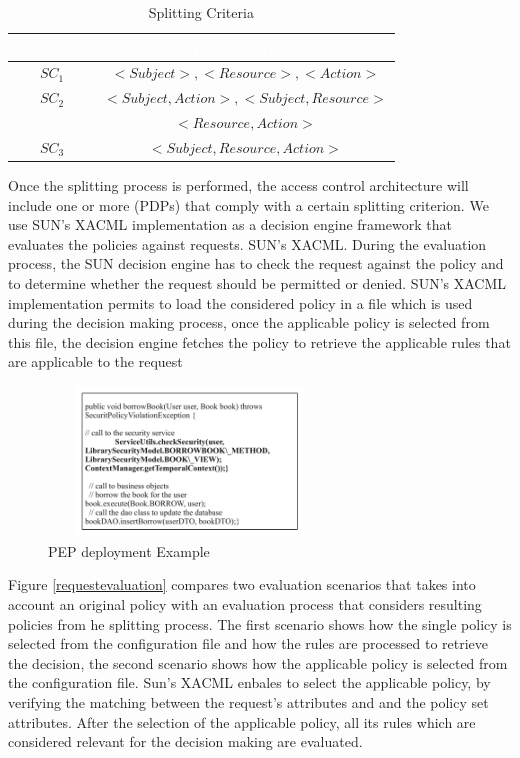 \begin{table}[h!]
\centering
\setlength{\extrarowheight}{6 pt}
\begin{tabular}{|>{\small}c|>{\small}c|} 
\hline  \rowcolor{black} 
\bf
\textcolor{white}{Categories}& \bf \textcolor{white}{Splitting Criteria}\\ \hline
$SC_{1}$& {$<Subject>, <Resource>, <Action>$}\\ \hline
$SC_{2}$& {$<Subject,Action>, <Subject,Resource>$}\\&{$<Resource,Action>$}\\  \hline
$SC_{3}$& {$<Subject,Resource,Action>$}\\ \hline
\end{tabular}
\caption{Splitting Criteria}
\label{table1}\end{table}


Once the splitting process is performed, the access control architecture will include one or more (PDPs) that comply with a certain splitting criterion.
We use SUN's XACML implementation \cite{sunxacml} as a decision engine framework that evaluates the policies against requests.
SUN's XACML. During the evaluation process, the SUN decision engine has to check the request against the policy and to determine whether the request should be
permitted or denied. SUN's XACML implementation permits to load the considered policy in a file which is used during the decision making process, once the applicable policy 
is selected from this file, the decision engine fetches the policy to retrieve the applicable rules that are applicable to the request

\begin{figure}[!h]
\begin{center}
\includegraphics[width=7.5cm, height=4cm]{PEPExample}
\caption{PEP deployment Example}
\label{PEP deployment Example}
\end{center}
\end{figure}
Figure \ref{requestevaluation} compares two evaluation scenarios that takes into account an original policy with an evaluation process that considers resulting policies from he splitting process. 
The first scenario shows how the single policy is selected from the configuration file and how the rules are processed to retrieve the decision, the second scenario shows how the applicable 
policy is selected from the configuration file. Sun's XACML enbales to select the applicable policy, by verifying the matching between the request's attributes and and the policy set attributes. 
After the selection of the applicable policy, all its rules which are considered relevant for the decision making are evaluated.


